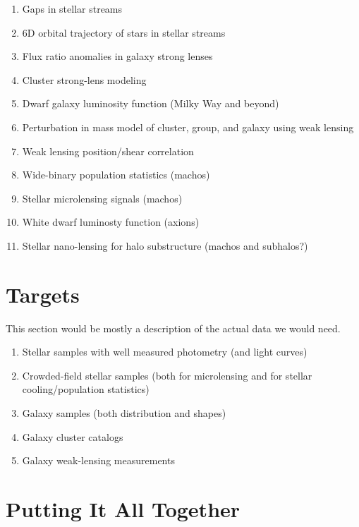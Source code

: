 \begin{enumerate}
\item Gaps in stellar streams
\item 6D orbital trajectory of stars in stellar streams
\item Flux ratio anomalies in galaxy strong lenses
\item Cluster strong-lens modeling 
\item Dwarf galaxy luminosity function (Milky Way and beyond)
\item Perturbation in mass model of cluster, group, and galaxy using weak lensing
\item Weak lensing position/shear correlation
\item Wide-binary population statistics (machos)
\item Stellar microlensing signals (machos)
\item White dwarf luminosty function (axions)
\item Stellar nano-lensing for halo substructure (machos and subhalos?)
\end{enumerate}

\section{Targets}
\label{sec:results}

This section would be mostly a description of the actual data we would need.

\begin{enumerate}
\item Stellar samples with well measured photometry (and light curves)
\item Crowded-field stellar samples (both for microlensing and for stellar cooling/population statistics)
\item Galaxy samples (both distribution and shapes)
\item Galaxy cluster catalogs
\item Galaxy weak-lensing measurements
\end{enumerate}


\section{Putting It All Together}
\label{sec:together}
